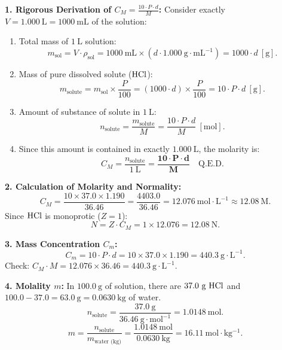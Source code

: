 \begin{solution}
\textbf{1. Rigorous Derivation of $C_M = \frac{10 \cdot P \cdot d}{M}$:}
Consider exactly $V = 1.000\ \mathrm{L} = 1000\ \mathrm{mL}$ of the solution:
\begin{enumerate}[leftmargin=1.5em,itemsep=1pt]
  \item Total mass of $1\ \mathrm{L}$ solution:
  \[
  m_{\text{sol}} = V \cdot \rho_{\text{sol}} = 1000\ \mathrm{mL} \times (d \cdot 1.000\ \mathrm{g\cdot mL^{-1}}) = 1000 \cdot d\ [\mathrm{g}].
  \]
  \item Mass of pure dissolved solute ($\ce{HCl}$):
  \[
  m_{\text{solute}} = m_{\text{sol}} \times \frac{P}{100} = (1000 \cdot d) \times \frac{P}{100} = 10 \cdot P \cdot d\ [\mathrm{g}].
  \]
  \item Amount of substance of solute in $1\ \mathrm{L}$:
  \[
  n_{\text{solute}} = \frac{m_{\text{solute}}}{M} = \frac{10 \cdot P \cdot d}{M}\ [\mathrm{mol}].
  \]
  \item Since this amount is contained in exactly $1.000\ \mathrm{L}$, the molarity is:
  \[
  C_M = \frac{n_{\text{solute}}}{1\ \mathrm{L}} = \mathbf{\frac{10 \cdot P \cdot d}{M}} \quad \text{Q.E.D.}
  \]
\end{enumerate}

\textbf{2. Calculation of Molarity and Normality:}
\[
C_M = \frac{10 \times 37.0 \times 1.190}{36.46} = \frac{4403.0}{36.46} = \mathbf{12.076\ \mathrm{mol\cdot L^{-1}} \approx 12.08\ \mathrm{M}}.
\]
Since $\ce{HCl}$ is monoprotic ($Z = 1$):
\[
N = Z \cdot C_M = 1 \times 12.076 = \mathbf{12.08\ \mathrm{N}}.
\]

\textbf{3. Mass Concentration $C_m$:}
\[
C_m = 10 \cdot P \cdot d = 10 \times 37.0 \times 1.190 = \mathbf{440.3\ \mathrm{g\cdot L^{-1}}}.
\]
Check: $C_M \cdot M = 12.076 \times 36.46 = 440.3\ \mathrm{g\cdot L^{-1}}$.

\textbf{4. Molality $m$:}
In $100.0\ \mathrm{g}$ of solution, there are $37.0\ \mathrm{g}\ \ce{HCl}$ and $100.0 - 37.0 = 63.0\ \mathrm{g} = 0.0630\ \mathrm{kg}$ of water.
\[
n_{\text{solute}} = \frac{37.0\ \mathrm{g}}{36.46\ \mathrm{g\cdot mol^{-1}}} = 1.0148\ \mathrm{mol}.
\]
\[
m = \frac{n_{\text{solute}}}{m_{\text{water (kg)}}} = \frac{1.0148\ \mathrm{mol}}{0.0630\ \mathrm{kg}} = \mathbf{16.11\ \mathrm{mol\cdot kg^{-1}}}.
\]
\end{solution}

